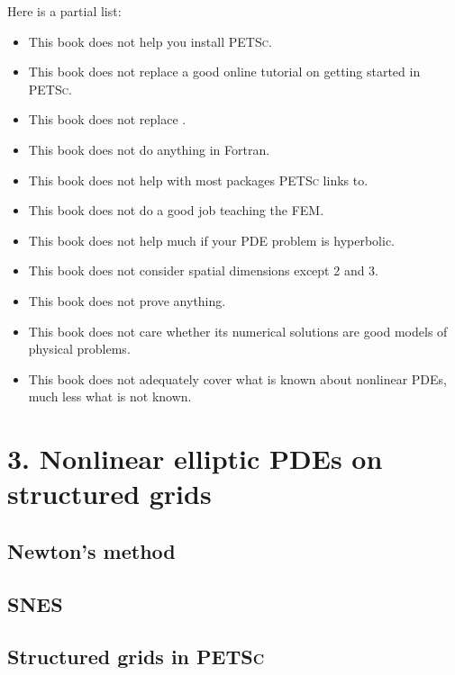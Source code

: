 \documentclass{tufte-book}
\newcommand*\FancyVerbStartString{fill string}
\newcommand*\FancyVerbStopString{fill string}
\newcommand{\cinputraw}[6]{
\renewcommand*\FancyVerbStartString{#5}
\renewcommand*\FancyVerbStopString{#6}
\begin{figure*}
\vspace{0.8cm}
\VerbatimInput[frame=single,%
               framesep=3mm,%
               label=\fbox{\normalsize \textsl{\,#2\,}#4},%
               fontfamily=courier,%
               fontsize=\small]{#1}
\vspace{0.5cm}
\caption{#3}
\end{figure*}
}
\newcommand{\cinput}[4]{%
    \cinputraw{cstrip/#1}{#1}{#2}{}{#3}{#4}}
\newcommand{\PETSc}{\textsc{PETSc}\xspace}
\begin{document}
Here is a partial list:\begin{itemize}
\item This book does not help you install \PETSc.
\item This book does not replace a good online tutorial on getting started in \PETSc.
\item This book does not replace \citep{Smithetal1996}.
\item This book does not do anything in Fortran.
\item This book does not help with most packages \PETSc links to.
\item This book does not do a good job teaching the FEM.
\item This book does not help much if your PDE problem is hyperbolic.
\item This book does not consider spatial dimensions except 2 and 3.
\item This book does not prove anything.
\item This book does not care whether its numerical solutions are good models of physical problems.
\item This book does not adequately cover what is known about nonlinear PDEs, much less what is not known.
\end{itemize}


\mainmatter






\chapter{3. Nonlinear elliptic PDEs on structured grids}

\section{Newton's method}

\section{\textsc{SNES}}


\section{Structured grids in \PETSc}
\end{document}
